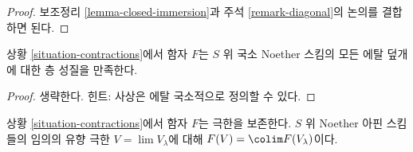 \begin{proof}
보조정리 \ref{lemma-closed-immersion}과
주석 \ref{remark-diagonal}의 논의를 결합하면 된다.
\end{proof}

\begin{lemma}
\label{lemma-sheaf}
상황 \ref{situation-contractions}에서 함자 $F$는
$S$ 위 국소 Noether 스킴의 모든 에탈 덮개에 대한 층 성질을 만족한다.
\end{lemma}

\begin{proof}
생략한다. 힌트: 사상은 에탈 국소적으로 정의할 수 있다.
\end{proof}

\begin{lemma}
\label{lemma-limit-preserving}
상황 \ref{situation-contractions}에서 함자 $F$는 극한을 보존한다.
$S$ 위 Noether 아핀 스킴들의 임의의 유향 극한
$V = \lim V_\lambda$에 대해 $F(V) = \colim F(V_\lambda)$이다.
\end{lemma}

